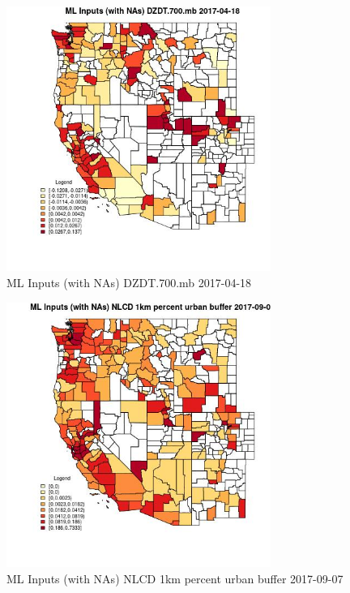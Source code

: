 \begin{figure} 
\centering  
\includegraphics[width=0.77\textwidth]{Code_Outputs/Report_ML_input_PM25_Step4_part_e_de_duplicated_aves_compiled_2019-05-20wNAs_CountyDZDT700mbMean2017-04-18.jpg} 
\caption{\label{fig:Report_ML_input_PM25_Step4_part_e_de_duplicated_aves_compiled_2019-05-20wNAsCountyDZDT700mbMean2017-04-18}ML Inputs (with NAs) DZDT.700.mb 2017-04-18} 
\end{figure} 
 

\begin{figure} 
\centering  
\includegraphics[width=0.77\textwidth]{Code_Outputs/Report_ML_input_PM25_Step4_part_e_de_duplicated_aves_compiled_2019-05-20wNAs_CountyNLCD_1km_percent_urban_bufferMean2017-09-07.jpg} 
\caption{\label{fig:Report_ML_input_PM25_Step4_part_e_de_duplicated_aves_compiled_2019-05-20wNAsCountyNLCD_1km_percent_urban_bufferMean2017-09-07}ML Inputs (with NAs) NLCD 1km percent urban buffer 2017-09-07} 
\end{figure} 
 

